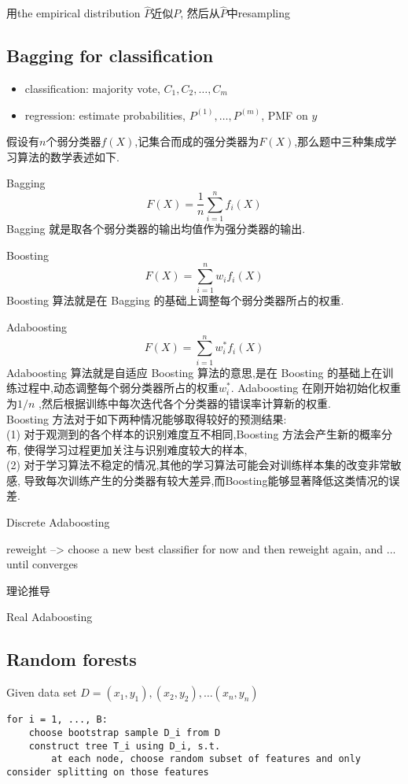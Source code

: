 \documentclass{article}
\begin{document}
用the empirical distribution $\hat{P}$近似$P$, 然后从$\hat{P}$中resampling

\subsection{Bagging for classification}
\begin{itemize}
\item classification: majority vote, $C_1, C_2, \ldots, C_m$
\item regression: estimate probabilities, $P^{(1)}, \ldots, P^{(m)}$, PMF on $y$
\end{itemize}

假设有$n$个弱分类器$f(X)$,记集合而成的强分类器为$F(X)$,那么题中三种集成学习算法的数学表述如下.

Bagging
$$ F(X) = \dfrac{1}{n} \sum_{i=1}^n f_i(X) $$
Bagging 就是取各个弱分类器的输出均值作为强分类器的输出.

Boosting
$$ F(X) = \sum_{i=1}^n w_i f_i(X) $$
Boosting 算法就是在 Bagging 的基础上调整每个弱分类器所占的权重.

Adaboosting
$$ F(X) = \sum_{i=1}^n w^{*}_i f_i(X) $$
Adaboosting 算法就是自适应 Boosting 算法的意思,是在 Boosting 的基础上在训练过程中,动态调整每个弱分类器所占的权重$w^*_i$.
Adaboosting 在刚开始初始化权重为$1/n$ ,然后根据训练中每次迭代各个分类器的错误率计算新的权重.\\
Boosting 方法对于如下两种情况能够取得较好的预测结果:\\
(1) 对于观测到的各个样本的识别难度互不相同,Boosting 方法会产生新的概率分布, 使得学习过程更加关注与识别难度较大的样本,\\
(2) 对于学习算法不稳定的情况,其他的学习算法可能会对训练样本集的改变非常敏感, 导致每次训练产生的分类器有较大差异,而Boosting能够显著降低这类情况的误差.

Discrete Adaboosting

reweight --> choose a new best classifier for now and then reweight again, and ... until converges

理论推导

Real Adaboosting

\subsection{Random forests}
Given data set $D = (x_1, y_1), (x_2, y_2), \ldots (x_n, y_n)$

\begin{verbatim}
for i = 1, ..., B:
    choose bootstrap sample D_i from D
    construct tree T_i using D_i, s.t.
        at each node, choose random subset of features and only consider splitting on those features
\end{verbatim}
\end{document}
